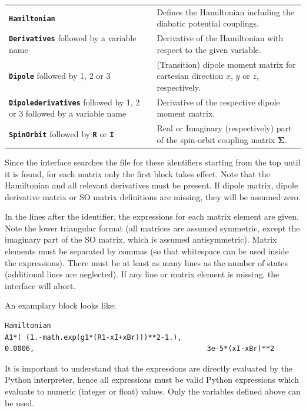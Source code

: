 \documentclass[a4paper,11pt,DIV=15,openany,twoside=false]{scrbook}
\newcommand{\ttt}[1]{\textbf{\texttt{#1}}}
\newenvironment{example}{
  \vspace{0mm}
  \definecolor{shadecolor}{HTML}{E4F4FF}
  \begin{shaded}
}{
  \end{shaded}
}
\begin{document}
\begin{tabular}{p{5cm}p{9cm}}
\ttt{Hamiltonian}                               &Defines the Hamiltonian including the diabatic potential couplings.\\
\ttt{Derivatives} followed by a variable name   &Derivative of the Hamiltonian with respect to the given variable.\\
\ttt{Dipole} followed by 1, 2 or 3              &(Transition) dipole moment matrix for cartesian direction $x$, $y$ or $z$, respectively.\\
\ttt{Dipolederivatives} followed by 1, 2 or 3 followed by a variable name       &Derivative of the respective dipole moment matrix.\\
\ttt{SpinOrbit} followed by \ttt{R} or \ttt{I}  &Real or Imaginary (respectively) part of the spin-orbit coupling matrix $\boldsymbol{\Sigma}$.\\
\end{tabular}

Since the interface searches the file for these identifiers starting from the top until it is found, for each matrix only the first block takes effect. Note that the Hamiltonian and all relevant derivatives must be present. If dipole matrix, dipole derivative matrix or SO matrix definitions are missing, they will be assumed zero.

In the lines after the identifier, the expressions for each matrix element are given. Note the lower triangular format (all matrices are assumed symmetric, except the imaginary part of the SO matrix, which is assumed antisymmetric). Matrix elements must be separated by commas (so that whitespace can be used inside the expressions). There must be at least as many lines as the number of states (additional lines are neglected). If any line or matrix element is missing, the interface will abort.

An examplary block looks like:
\begin{example}
  \begin{verbatim}
Hamiltonian
A1*( (1.-math.exp(g1*(R1-xI+xBr)))**2-1.),
0.0006,                                         3e-5*(xI-xBr)**2
  \end{verbatim}
\end{example}
It is important to understand that the expressions are directly evaluated by the Python interpreter, hence all expressions must be valid Python expressions which evaluate to numeric (integer or float) values. Only the variables defined above can be used. 
\end{document}
